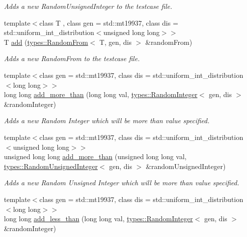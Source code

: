 \begin{DoxyCompactItemize}
\begin{DoxyCompactList}\small\item\em Adds a new Random\+Unsigned\+Integer to the testcase file. \end{DoxyCompactList}\item 
{\footnotesize template$<$class T , class gen  = std\+::mt19937, class dis  = std\+::uniform\+\_\+int\+\_\+distribution$<$unsigned long long$>$$>$ }\\T \hyperlink{classtestcaser_1_1maker_1_1TestCaseBuilder_a9c3e973820d032cce82ab0d070c700f9}{add} (\hyperlink{structtestcaser_1_1maker_1_1types_1_1RandomFrom}{types\+::\+Random\+From}$<$ T, gen, dis $>$ \&random\+From)
\begin{DoxyCompactList}\small\item\em Adds a new Random\+From to the testcase file. \end{DoxyCompactList}\item 
{\footnotesize template$<$class gen  = std\+::mt19937, class dis  = std\+::uniform\+\_\+int\+\_\+distribution$<$long long$>$$>$ }\\long long \hyperlink{classtestcaser_1_1maker_1_1TestCaseBuilder_ac6cfa5b3269b899b19fc5b4d2e97b4aa}{add\+\_\+more\+\_\+than} (long long val, \hyperlink{classtestcaser_1_1maker_1_1types_1_1RandomInteger}{types\+::\+Random\+Integer}$<$ gen, dis $>$ \&random\+Integer)
\begin{DoxyCompactList}\small\item\em Adds a new Random Integer which will be more than value specified. \end{DoxyCompactList}\item 
{\footnotesize template$<$class gen  = std\+::mt19937, class dis  = std\+::uniform\+\_\+int\+\_\+distribution$<$unsigned long long$>$$>$ }\\unsigned long long \hyperlink{classtestcaser_1_1maker_1_1TestCaseBuilder_a00745e4a312209178432e06d4c9aae08}{add\+\_\+more\+\_\+than} (unsigned long long val, \hyperlink{classtestcaser_1_1maker_1_1types_1_1RandomUnsignedInteger}{types\+::\+Random\+Unsigned\+Integer}$<$ gen, dis $>$ \&random\+Unsigned\+Integer)
\begin{DoxyCompactList}\small\item\em Adds a new Random Unsigned Integer which will be more than value specified. \end{DoxyCompactList}\item 
{\footnotesize template$<$class gen  = std\+::mt19937, class dis  = std\+::uniform\+\_\+int\+\_\+distribution$<$long long$>$$>$ }\\long long \hyperlink{classtestcaser_1_1maker_1_1TestCaseBuilder_a6649b1f108aae10780562876df58a5b2}{add\+\_\+less\+\_\+than} (long long val, \hyperlink{classtestcaser_1_1maker_1_1types_1_1RandomInteger}{types\+::\+Random\+Integer}$<$ gen, dis $>$ \&random\+Integer)

\end{DoxyCompactItemize}
